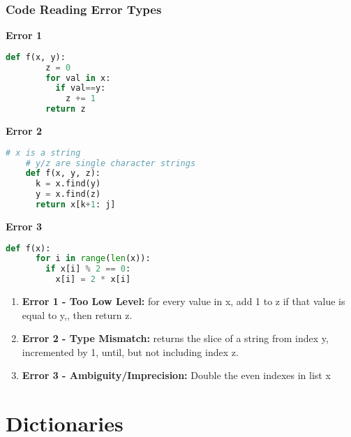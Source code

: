 \documentclass{beamer}
\begin{document}
%
%
\begin{frame}[fragile]
  \frametitle{Code Reading Error Types} 
  \begin{minipage}{0.265\textwidth}
    \textbf{Error 1}
    \begin{lstlisting}[language=Python, autogobble]
      def f(x, y):
        z = 0
        for val in x:
          if val==y:
            z += 1
        return z
    \end{lstlisting}
    \vfill
  \end{minipage}
  \begin{minipage}{0.3\textwidth}
    \textbf{Error 2}
    \begin{lstlisting}[language=Python, autogobble]
    # x is a string
    # y/z are single character strings
    def f(x, y, z):
      k = x.find(y)
      y = x.find(z)
      return x[k+1: j]
    \end{lstlisting}
    \vfill
  \end{minipage}
  \begin{minipage}{0.415\textwidth}
    \textbf{Error 3}
    \begin{lstlisting}[language=Python, autogobble]
    def f(x):
      for i in range(len(x)):
        if x[i] % 2 == 0:
          x[i] = 2 * x[i]
    \end{lstlisting}
    \vfill
  \end{minipage}
  \vfill
  \begin{enumerate}[A]
    \item \textbf{Error 1 - Too Low Level: } for every value in x, add 1 to z if that value is equal to y,, then return z.
    \item \textbf{Error 2 - Type Mismatch: } returns the slice of a string from index y, incremented by 1, until, but not including index z.
    \item \textbf{Error 3 - Ambiguity/Imprecision: } Double the even indexes in list x
  \end{enumerate}
\end{frame}


\section{Dictionaries}
\end{document}
